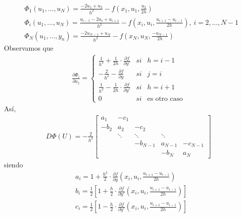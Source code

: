 \begin{align*}
     & \Phi_1(u_1,\ldots,u_N) = \frac{-2u_1 + u_2}{h^2} - f\left( x_1,u_1, \frac{u_2}{2h} \right)                                               \\
     & \Phi_i(u_1,\ldots,u_N) = \frac{u_{i-1} - 2u_i + u_{i+1}}{h^2} - f\left(x_i, u_i, \frac{u_{i+1} -u_{i-1}}{2h} \right), \ i = 2,\ldots,N-1 \\
     & \Phi_N(u_1,\ldots,y_n) = \frac{-2u_{N-1} + u_N}{h^2} - f\left( x_N,u_N, \frac{-u_{N-1  }}{2h} \right)
\end{align*}
Observamos que
\begin{align*}
    \frac{\partial \Phi_i}{\partial u_j} = \left\{ \begin{array}{lcc}
                                                       \frac{1}{h^2} + \frac{1}{2h} \cdot \frac{\partial f}{\partial y'} & si & h = i-1             \\
                                                       -\frac{2}{h^2} - \frac{\partial f}{\partial y}                    & si & j = i               \\
                                                       \frac{1}{h^2} - \frac{1}{2h} \cdot \frac{\partial f}{\partial y'} & si & h = i+1             \\
                                                       0                                                                 & si & \text{es otro caso}
                                                   \end{array}
    \right.
\end{align*}
Así,
\begin{align*}
    D\Phi(U) = -\frac{2}{h^2} \begin{bmatrix}
                                  a_1  & -c_1   &          &         &          \\
                                  -b_2 & a_2    & -c_2     &         &          \\
                                       & \ddots & \ddots   & \ddots  &          \\
                                       &        & -b_{N-1} & a_{N-1} & -c_{N-1} \\
                                       &        &          & -b_N    & a_N
                              \end{bmatrix}
\end{align*}
siendo
\begin{align*}
     & a_i = 1 + \frac{h^2}{2} \cdot \frac{\partial f}{\partial y} \left(x_i,u_i, \frac{u_{i+1} - u_{i-1}}{2h} \right)                           \\
     & b_i = \frac{1}{2} \left[ 1 + \frac{h}{2} \cdot \frac{\partial f}{\partial y'} \left(x_i,u_i, \frac{u_{i+1} - u_{i-1}}{2h} \right) \right] \\
     & c_i = \frac{1}{2} \left[ 1 - \frac{h}{2} \cdot \frac{\partial f}{\partial y'} \left(x_i,u_i, \frac{u_{i+1} - u_{i-1}}{2h} \right) \right]
\end{align*}